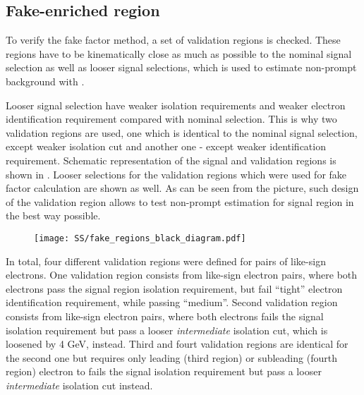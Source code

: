 \subsection{Fake-enriched region}
To verify the fake factor method, a set of validation regions is checked. 
These regions have to be kinematically close as much as possible to
the nominal signal selection as well as looser signal selections, 
which is used to estimate non-prompt background with .

Looser signal selection have weaker isolation requirements and weaker 
electron identification requirement compared with nominal selection.
This is why two validation regions are used, one which is identical
to the nominal signal selection, except weaker isolation cut and another
one - except weaker identification requirement. 
Schematic representation of the signal and validation regions is shown
in . 
Looser selections for the
validation regions which were used for fake factor calculation are shown
as well. As can be seen from the picture, such design of the validation
region allows to test non-prompt estimation for signal region in the 
best way possible.

\begin{figure}[h]
\begin{center}
\texttt{[image: SS/fake\_regions\_black\_diagram.pdf]}
\caption{\toDo}
\label{fig:fake_validation_regions}
\end{center}
\end{figure}

In total, four different validation regions were defined for pairs of like-sign electrons.
One validation region consists from like-sign electron pairs, where both electrons pass the signal region isolation requirement, 
but fail ``tight'' electron identification requirement, while passing ``medium''.
Second validation region consists from like-sign electron pairs, where both electrons fails the signal isolation requirement
but pass a looser \textit{intermediate} isolation cut, which is loosened by 4 GeV, instead.
Third and fourt validation regions are identical for the second one but requires only leading (third region) or subleading (fourth region)
electron to fails the signal isolation requirement but pass a looser \textit{intermediate} isolation cut instead.

